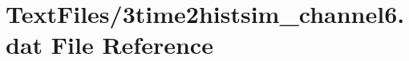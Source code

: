 \hypertarget{3time2histsim__channel6_8dat}{}\section{Text\+Files/3time2histsim\+\_\+channel6.dat File Reference}
\label{3time2histsim__channel6_8dat}
